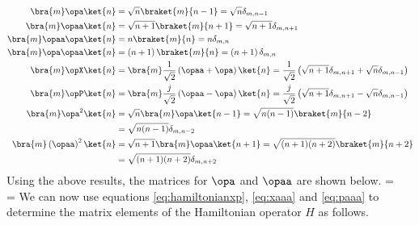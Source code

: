 \begin{align}
\bra{m}\opa\ket{n} &= \sqrt{n}\braket{m}{n-1} = \sqrt{n}\delta_{m,n-1}\\
\bra{m}\opaa\ket{n} &= \sqrt{n+1}\braket{m}{n+1} = \sqrt{n+1}\delta_{m,n+1}\\ 
\bra{m}\opaa\opa\ket{n} &= n\braket{m}{n} = n\delta_{m,n}\\ 
\bra{m}\opa\opaa\ket{n} &= \left(n+1\right)\braket{m}{n} = \left(n+1\right)\delta_{m,n}\\ 
\bra{m}\opX\ket{n} &= \bra{m}\frac{1}{\sqrt{2}}\left(\opaa + \opa\right)\ket{n} = \frac{1}{\sqrt{2}}\left(\sqrt{n+1}\delta_{m,n+1} + \sqrt{n}\delta_{m,n-1}\right)\\ 
\bra{m}\opP\ket{n} &= \bra{m}\frac{j}{\sqrt{2}}\left(\opaa - \opa\right)\ket{n} = \frac{j}{\sqrt{2}}\left(\sqrt{n+1}\delta_{m,n+1} - \sqrt{n}\delta_{m,n-1}\right)\\ 
\bra{m}\opa^2\ket{n} &= \sqrt{n}\bra{m}\opa\ket{n-1} = \sqrt{n(n-1)}\braket{m}{n-2}\notag\\
&= \sqrt{n(n-1)}\delta_{m,n-2}\\ 
\bra{m}\left(\opaa\right)^2\ket{n} &= \sqrt{n+1}\bra{m}\opaa\ket{n+1} = \sqrt{(n+1)(n+2)}\braket{m}{n+2}\notag\\
&= \sqrt{(n+1)(n+2)}\delta_{m,n+2}
\end{align}
Using the above results, the matrices for $\opa$ and $\opaa$ are shown below.
\beq
\opa =  ~ \opaa = 
\eeq
We can now use equations \eqref{eq:hamiltonianxp}, \eqref{eq:xaaa} and \eqref{eq:paaa} to determine the matrix elements of the Hamiltonian operator $H$ as follows.
